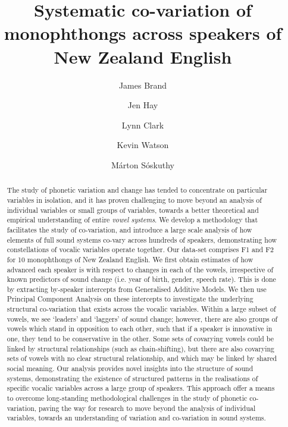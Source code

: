 \documentclass[review]{elsarticle} %
\begin{document}
\begin{frontmatter}



\title{
Systematic co-variation of monophthongs across speakers of New Zealand English
}
\author[1]{James Brand}
\author[1,2]{Jen Hay}
\author[1,2]{Lynn Clark}
\author[1,2]{Kevin Watson}
\author[3]{M\'{a}rton S\'{o}skuthy}

\address[1]{New Zealand Institute of Language, Brain and Behaviour, University of Canterbury, New Zealand}
\address[2]{Department of Linguistics, University of Canterbury, New Zealand}
\address[3]{Department of Linguistics, The University of British Columbia, Canada}


\begin{abstract}

The study of phonetic variation and change has tended to concentrate on particular variables in isolation, and it has proven challenging to move beyond an analysis of individual variables or small groups of variables, towards a better theoretical and empirical understanding of entire \textit{vowel systems}. We develop a methodology that facilitates the study of co-variation, and introduce a large scale analysis of how elements of full sound systems co-vary across hundreds of speakers, demonstrating how constellations of vocalic variables operate together. Our data-set comprises F1 and F2 for 10 monophthongs of New Zealand English. We first obtain estimates of how advanced each speaker is with respect to changes in each of the vowels, irrespective of known predictors of sound change (i.e. year of birth, gender, speech rate). This is done by extracting by-speaker intercepts from Generalised Additive Models. We then use Principal Component Analysis on these intercepts to investigate the underlying structural co-variation that exists across the vocalic variables.  Within a large subset of vowels, we see `leaders' and `laggers' of sound change; however, there are also groups of vowels which stand in opposition to each other, such that if a speaker is innovative in one, they tend to be conservative in the other.  Some sets of covarying vowels could be linked by structural relationships (such as chain-shifting), but there are also covarying sets of vowels with no clear structural relationship, and which may be linked by shared social meaning. Our analysis provides novel insights into the structure of sound systems, demonstrating the existence of structured patterns in the realisations of specific vocalic variables across a large group of speakers. This approach offer a means to overcome long-standing methodological challenges in the study of phonetic co-variation, paving the way for research to move beyond the analysis of individual variables, towards an understanding of variation and co-variation in sound systems.
\end{abstract}



\end{frontmatter}
\end{document}
